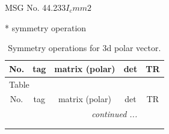 \documentclass[fleqn,8pt]{jsarticle}
\begin{document}
\setcounter{MaxMatrixCols}{32}

\renewcommand{\tablename}{Table~}
\renewcommand{\figurename}{Figure~}
\begin{center}
\LARGE
MSG No. 44.233\quad$I_{c}mm2$
\end{center}
* symmetry operation
\renewcommand{\arraystretch}{1.3}
\begin{longtable}{ccccc}
\caption{Symmetry operations for 3d polar vector.}
 \\
 \hline \hline
No. & tag & matrix (polar) & det & TR \\ \hline \endfirsthead

\multicolumn{4}{l}{\tablename\ \thetable{}} \\
 \hline \hline
No. & tag & matrix (polar) & det & TR \\ \hline \endhead

 \hline \hline
\multicolumn{4}{r}{\footnotesize\it continued ...} \\ \endfoot

 \hline \hline
\multicolumn{4}{r}{} \\ \endlastfoot


\end{longtable}
\end{document}
